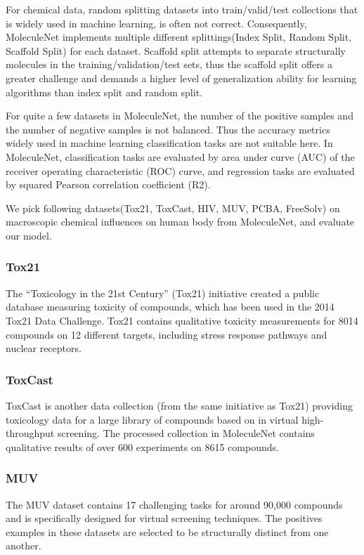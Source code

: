 \documentclass[letterpaper]{article} \usepackage{aaai18}  \usepackage{times}  \usepackage{helvet}  \usepackage{courier}  \usepackage{url}  \usepackage{graphicx}  \usepackage{amsmath}
\begin{document}
For chemical data, random splitting datasets into train/valid/test collections that is widely used in machine learning, is often not correct\cite{sheridan2013time}. Consequently, MoleculeNet implements multiple different splittings(Index Split, Random Split, Scaffold Split) for each dataset. Scaffold split attempts to separate structurally molecules in the training/validation/test sets, thus the scaffold split offers a greater challenge and demands a higher level of generalization ability for learning algorithms than index split and random split. 

For quite a few datasets in MoleculeNet, the number of the positive samples and the number of negative samples is not balanced. Thus the accuracy metrics widely used in machine learning classification tasks are not suitable here. In MoleculeNet, classification tasks are evaluated by area under curve (AUC) of the receiver operating characteristic (ROC) curve, and regression tasks are evaluated by squared Pearson correlation coefficient (R2).

We pick following datasets(Tox21, ToxCast, HIV, MUV, PCBA, FreeSolv) on macroscopic chemical influences on human body from MoleculeNet, and evaluate our model.


\subsubsection{Tox21} 
The “Toxicology in the 21st Century” (Tox21) initiative created a public database measuring toxicity of compounds, which has been used in the 2014 Tox21 Data Challenge\cite{tox21}. Tox21 contains qualitative toxicity measurements for 8014 compounds on 12 different targets, including stress response pathways and nuclear receptors.

\subsubsection{ToxCast}ToxCast is another data collection (from the same initiative as Tox21) providing toxicology data for a large library of compounds based on in virtual high-throughput screening\cite{richard2016toxcast}. The processed collection in MoleculeNet contains qualitative results of over 600 experiments on 8615 compounds.

\subsubsection{MUV}The MUV dataset\cite{rohrer2009maximum} contains 17 challenging tasks for around 90,000 compounds and is specifically designed for virtual screening techniques. The positives examples in these datasets are selected to be structurally distinct from one another.
\end{document}
